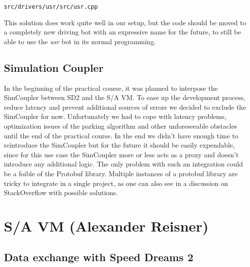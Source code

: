 \documentclass[paper=a4, fontsize=11pt]{scrreprt}
\begin{document}
\begin{listing}[ht]
  \inputminted[firstline=751,linenos=true,lastline=755,gobble=4]{c++}{../../../simulators/speed-dreams/src/drivers/usr/src/usr.cpp}
  \caption{\texttt{src/drivers/usr/src/usr.cpp}}\label{aw_parked}
\end{listing}

This solution does work quite well in our setup,
but the code should be moved to a completely new driving bot with an expressive name for the future,
to still be able to use the \textit{usr} bot in its normal programming.

\section{Simulation Coupler}
In the beginning of the practical course,
it was planned to interpose the SimCoupler between SD2 and the S/A VM.
To ease up the development process, reduce latency and
prevent additional sources of errors we decided to exclude the SimCoupler for now.
Unfortunately we had to cope with latency problems,
optimization issues of the parking algorithm and other unforeseeable obstacles until the end of the practical course.
In the end we didn't have enough time to reintroduce the SimCoupler
but for the future it should be easily expendable,
since for this use case the SimCoupler more or less acts as a proxy
and doesn't introduce any additional logic.
The only problem with such an integration could be a foible of the Protobuf library.
Multiple instances of a protobuf library are tricky to integrate in a single project,
as one can also see in a discussion on StackOverflow \cite{soprotobuf} with possible solutions.

\chapter{S/A VM (Alexander Reisner)}
\section{Data exchange with Speed Dreams 2}
\end{document}
